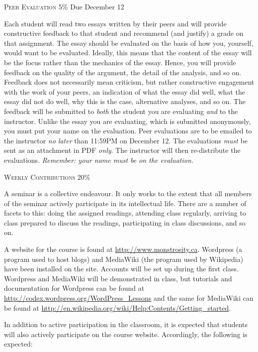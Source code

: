 \documentclass[12pt]{article}
\begin{document}
{\large \textsc{Peer Evaluation 5\%} Due December 12}

Each student will read two essays written by their peers and will provide constructive feedback to that student and recommend (and justify) a grade on that assignment. The essay should be evaluated on the basis of how you, yourself, would want to be evaluated. Ideally, this means that the content of the essay will be the focus rather than the mechanics of the essay. Hence, you will provide feedback on the quality of the argument, the detail of the analysis, and so on. Feedback does not necessarily mean criticism, but rather constructive engagement with the work of your peers, an indication of what the essay did well, what the essay did not do well, why this is the case, alternative analyses, and so on. The feedback will be submitted to \textit{both} the student you are evaluating \textit{and} to the instructor. Unlike the essay you are evaluating, which is submitted anonymously, you must put your name on the evaluation. Peer evaluations are to be emailed to the instructor \textit{no later} than 11:59PM on December 12. The evaluations \textit{must} be sent as an attachment in PDF \textit{only}. The instructor will then re-distribute the evaluations. \textit{Remember: your name must be on the evaluation.}

{\large \textsc{Weekly Contributions 20\%}}

A seminar is a collective endeavour. It only works to the extent that all members of the seminar actively participate in its intellectual life. There are a number of facets to this: doing the assigned readings, attending class regularly, arriving to class prepared to discuss the readings, participating in class discussions, and so on. 

A website for the course is found at \href{http://www.monstrosity.ca}{http://www.monstrosity.ca}. Wordpress (a program used to host blogs) and MediaWiki (the program used by Wikipedia) have been installed on the site. Accounts will be set up during the first class. Wordpress and MediaWiki will be demonstrated in class, but tutorials and documentation for Wordpress can be found at \href{http://codex.wordpress.org/WordPress\_Lessons}{http://codex.wordpress.org/WordPress\_Lessons} and the same for MediaWiki can be found at \href{http://en.wikipedia.org/wiki/Help:Contents/Getting\_started}{http://en.wikipedia.org/wiki/Help:Contents/Getting\_started}.

In addition to active participation in the classroom, it is expected that students will also actively participate on the course website. Accordingly, the following is expected:
\end{document}
